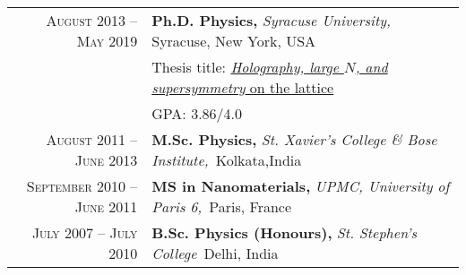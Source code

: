 \begin{tabular}{rl}	

\textsc{August 2013 -- May 2019} &\textbf{Ph.D. Physics, } \emph{Syracuse University,} Syracuse, New York, USA\\ 
& Thesis title: \textcolor{blue}{\href{https://surface.syr.edu/etd/1003/}{\emph{Holography, large $N$, and \textit{supersymmetry}} on the lattice}} \\ & \textsc{GPA:} 3.86/4.0\\
	\textsc{August 2011 -- June 2013} & \textbf{M.Sc. Physics, }\emph{St. Xavier's College \& Bose Institute,}{~Kolkata,}{India} \\
\textsc{September 2010 -- June 2011} &\textbf{MS in Nanomaterials, }\emph{UPMC, University of Paris 6,}{~Paris, }{France} \\
\textsc{July 2007 -- July 2010} & \textbf{B.Sc. Physics (Honours), } \emph{St. Stephen's College}{~Delhi, }{India} \\	
\end{tabular}
